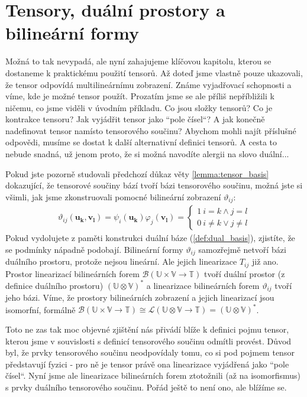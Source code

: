 \documentclass[a5paper,12pt]{amsbook}
\theoremstyle{definition}
\newcommand{\myvec}[1]{\mathbf{#1}}
\newcommand{\myspace}[1]{\mathbb{#1}}
\begin{document}
\section{Tensory, duální prostory a bilineární formy}

\noindent
Možná to tak nevypadá, ale nyní zahajujeme klíčovou kapitolu, kterou se dostaneme k praktickému
použití tensorů. Až doteď jsme vlastně pouze ukazovali, že tensor odpovídá multilineárnímu
zobrazení. Známe vyjadřovací schopnosti a víme, kde je možné tensor použít. Prozatím jsme
se ale příliš nepříbližili k ničemu, co jsme viděli v úvodním příkladu. Co jsou složky tensorů?
Co je kontrakce tensoru? Jak vyjádřit tensor jako ``pole čísel``? A jak konečně nadefinovat
tensor namísto tensorového součinu? Abychom mohli najít příslušné odpovědi, musíme se dostat
k další alternativní definici tensorů. A cesta to nebude snadná, už jenom proto, že si možná
navodíte alergii na slovo duální...

Pokud jste pozorně studovali předchozí důkaz věty \ref{lemma:tensor_basis} dokazující, že
tensorové součiny bází tvoří bázi tensorového součinu, možná jste si všimli, jak jsme zkonstruovali
pomocné bilineární zobrazení $\vartheta_{ij}$:
\begin{equation*}
\begin{split}
\vartheta_{ij}(\myvec{u_k}, \myvec{v_l}) = \psi_i(\myvec{u_k})\varphi_j(\myvec{v_l}) =
\begin{cases}
1 \: i = k \wedge j = l \\
0 \: i \neq k \vee j \neq l
\end{cases}
\end{split}
\end{equation*}
Pokud vydolujete z paměti konstrukci duální báze (\ref{def:dual_basis}), zjistíte, že se podmínky
nápadně podobají. Bilineární formy $\vartheta_{ij}$ samozřejmě netvoří bázi duálního prostoru,
protože nejsou lineární. Ale jejich linearizace $T_{ij}$ již ano. Prostor linearizací bilineárních
forem $\mathcal{B}(\myspace{U}\times\myspace{V}\rightarrow\myspace{T})$ tvoří duální prostor
(z definice duálního prostoru) $(\myspace{U}\otimes\myspace{V})^*$ a linearizace bilineárních
forem $\vartheta_{ij}$ tvoří jeho bázi. Víme, že prostory bilineárních zobrazení a jejich linearizací
jsou isomorfní, formálně $\mathcal{B}(\myspace{U}\times\myspace{V}\rightarrow\myspace{T})\cong
\mathcal{L}(\myspace{U}\otimes\myspace{V}\rightarrow\myspace{T}) = (\myspace{U}\otimes\myspace{V})^*$.

Toto ne zas tak moc objevné zjištění nás přivádí blíže k definici pojmu tensor, kterou jsme v souvislosti
s definicí tensorového součinu odmítli provést. Důvod byl, že prvky tensorového součinu neodpovídaly
tomu, co si pod pojmem tensor představují fyzici - pro ně je tensor právě ona linearizace vyjádřená
jako ``pole čísel``. Nyní jsme ale linearizace bilineárních forem ztotožnili (až na isomorfismus)
s prvky duálního tensorového součinu. Pořád ještě to není ono, ale blížíme se.
\end{document}

